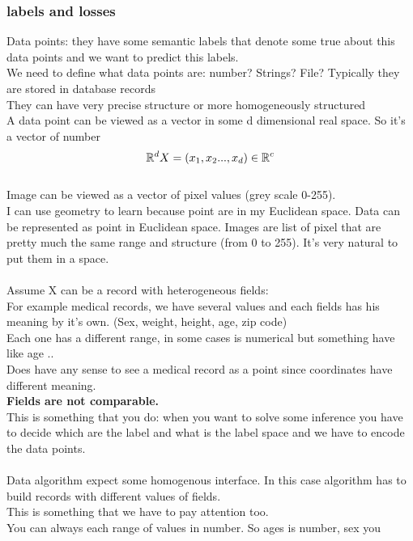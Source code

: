 \subsubsection{labels and losses}
Data points: they have some semantic labels that denote some true about this data points and we want to predict this labels.\\
We need to define what data points are: number? Strings? File? Typically they are stored in database records \\
They can have very precise structure or more homogeneously structured \\
A data point can be viewed as a vector in some d dimensional real space. So it’s a vector of number
\\
$$
\mathbb{R}^d\\\\
X = (x_1,x_2 ..., x_d) \in \mathbb{R}^c
$$
\\
Image can be viewed as a vector of pixel values (grey scale 0-255).\\
I can use geometry to learn because point are in my Euclidean space. Data can be represented as point in Euclidean space. Images are list of pixel that are pretty much the same range and structure (from 0 to 255). It’s very natural to put them in a space.\\\\
Assume X can be a record with heterogeneous fields:\\
For example medical records, we have several values and each fields has his meaning by it’s own. (Sex, weight, height, age, zip code)\\
Each one has a different range, in some cases is numerical but something have like age ..\\
Does have any sense to see a medical record as a point since coordinates
have different meaning.\\
\textbf{Fields are not comparable.}\\
This is something that you do: when you want to solve some inference you have to decide which are the label and what is the label space and we have to encode the data points.\\\\
Data algorithm expect some homogenous interface.
In this case algorithm has to build records with different values of fields.\\
This is something that we have to pay attention too.\\
You can always each range of values in number. So ages is number, sex you

